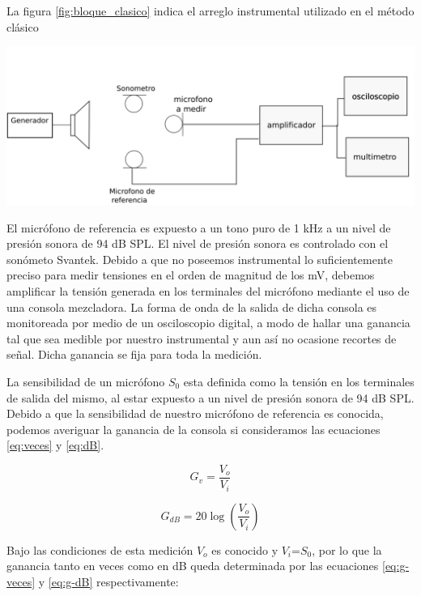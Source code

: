 \documentclass[]{article}
\makeatletter
\newenvironment{figurehere}   %
  {\def\@captype{figure}}   %
  {\par\medskip}
  {}              %
\makeatother
\begin{document}
\begin{multicols}{2}
La figura \ref{fig:bloque_clasico} indica el arreglo instrumental utilizado en el
método clásico

\begin{figurehere}
 \centering
 \includegraphics[width=\linewidth]{blockdiag}
 \label{fig:bloque_clasico}
\end{figurehere}

El micrófono de referencia es expuesto a un tono puro de 1 kHz a un nivel de
presión sonora de 94 dB SPL. El nivel de presión sonora es controlado con el
sonómeto Svantek. Debido a que no poseemos instrumental lo suficientemente
preciso para medir tensiones en el orden de magnitud de los mV, debemos amplificar
la tensión generada en los terminales del micrófono mediante el uso de una
consola mezcladora. La forma de onda de la salida de dicha consola es monitoreada
por medio de un osciloscopio digital, a modo de hallar una ganancia tal que sea
medible por nuestro instrumental y aun así no ocasione recortes de señal. Dicha
ganancia se fija para toda la medición.

La sensibilidad de un micrófono $S_0$ esta definida como la tensión en los terminales
de salida del mismo, al estar expuesto a un nivel de presión sonora de 94 dB SPL.
Debido a que la sensibilidad de nuestro micrófono de referencia es conocida,
podemos averiguar la ganancia de la consola si consideramos las ecuaciones
\ref{eq:veces} y \ref{eq:dB}.

\begin{equation}
  G_v=\frac{V_o}{V_i}
  \label{eq:veces}
\end{equation}

\begin{equation}
  G_{dB}= 20 \log \left(\frac{V_o}{V_i}\right)
  \label{eq:dB}
\end{equation}

Bajo las condiciones de esta medición $V_o$ es conocido y $V_i$=$S_0$, por lo que
la ganancia tanto en veces como en dB queda determinada por las ecuaciones
\ref{eq:g-veces} y \ref{eq:g-dB} respectivamente:


\end{multicols}
\end{document}
